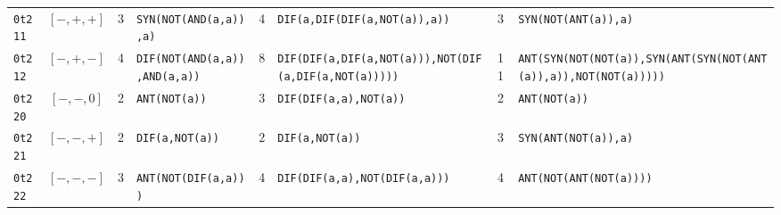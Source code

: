 \documentclass[10pt,a4paper]{article}
\begin{document}
\begin{landscape}
\begin{center}
\begin{longtable}{lcc>{\raggedright\arraybackslash}p{4.6cm}c>{\raggedright\arraybackslash}p{4.6cm}c>{\raggedright\arraybackslash}p{4.4cm}}
\texttt{0t211}&$[-,+,+]$&3&\texttt{SYN(\allowbreak NOT(\allowbreak AND(\allowbreak a,\allowbreak a)),\allowbreak a)}&4&\texttt{DIF(\allowbreak a,\allowbreak DIF(\allowbreak DIF(\allowbreak a,\allowbreak NOT(\allowbreak a)),\allowbreak a))}&3&\texttt{SYN(\allowbreak NOT(\allowbreak ANT(\allowbreak a)),\allowbreak a)}\\
\texttt{0t212}&$[-,+,-]$&4&\texttt{DIF(\allowbreak NOT(\allowbreak AND(\allowbreak a,\allowbreak a)),\allowbreak AND(\allowbreak a,\allowbreak a))}&8&\texttt{DIF(\allowbreak DIF(\allowbreak a,\allowbreak DIF(\allowbreak a,\allowbreak NOT(\allowbreak a))),\allowbreak NOT(\allowbreak DIF(\allowbreak a,\allowbreak DIF(\allowbreak a,\allowbreak NOT(\allowbreak a)))))}&11&\texttt{ANT(\allowbreak SYN(\allowbreak NOT(\allowbreak NOT(\allowbreak a)),\allowbreak SYN(\allowbreak ANT(\allowbreak SYN(\allowbreak NOT(\allowbreak ANT(\allowbreak a)),\allowbreak a)),\allowbreak NOT(\allowbreak NOT(\allowbreak a)))))}\\
\texttt{0t220}&$[-,-,0]$&2&\texttt{ANT(\allowbreak NOT(\allowbreak a))}&3&\texttt{DIF(\allowbreak DIF(\allowbreak a,\allowbreak a),\allowbreak NOT(\allowbreak a))}&2&\texttt{ANT(\allowbreak NOT(\allowbreak a))}\\
\texttt{0t221}&$[-,-,+]$&2&\texttt{DIF(\allowbreak a,\allowbreak NOT(\allowbreak a))}&2&\texttt{DIF(\allowbreak a,\allowbreak NOT(\allowbreak a))}&3&\texttt{SYN(\allowbreak ANT(\allowbreak NOT(\allowbreak a)),\allowbreak a)}\\
\texttt{0t222}&$[-,-,-]$&3&\texttt{ANT(\allowbreak NOT(\allowbreak DIF(\allowbreak a,\allowbreak a)))}&4&\texttt{DIF(\allowbreak DIF(\allowbreak a,\allowbreak a),\allowbreak NOT(\allowbreak DIF(\allowbreak a,\allowbreak a)))}&4&\texttt{ANT(\allowbreak NOT(\allowbreak ANT(\allowbreak NOT(\allowbreak a))))}\\
\bottomrule\end{longtable}\end{center}
\end{landscape}
\end{document}
